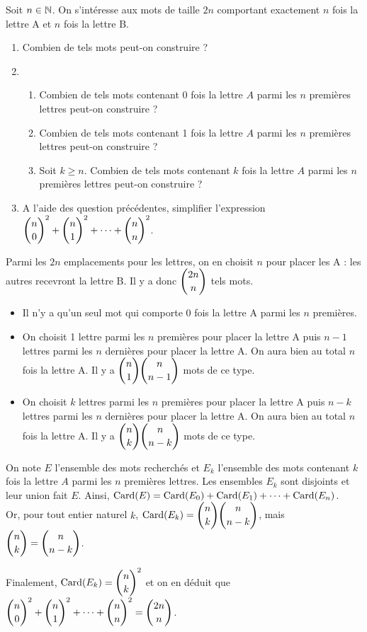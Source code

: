 \documentclass[11pt,fleqn, openany]{book} %
\begin{document}
\begin{exercise}Soit $n\in \mathbb{N}$. On s'intéresse aux mots de taille $2n$ comportant exactement $n$ fois la lettre A et $n$ fois la lettre B.

\begin{enumerate}
\item Combien de tels mots peut-on construire ?
\item \begin{enumerate}
\item Combien de tels mots contenant 0 fois la lettre $A$ parmi les $n$ premières lettres peut-on construire ?
\item Combien de tels mots contenant 1 fois la lettre $A$ parmi les $n$ premières lettres peut-on construire ?
\item Soit $k\geqslant n$. Combien de tels mots contenant $k$ fois la lettre $A$ parmi les $n$ premières lettres peut-on construire ?
\end{enumerate}
\item A l'aide des question précédentes, simplifier l'expression $\dbinom{n}{0}^2+\dbinom{n}{1}^2+\dots+\dbinom{n}{n}^2$.
\end{enumerate}
\end{exercise}

\begin{solution}Parmi les $2n$ emplacements pour les lettres, on en choisit $n$ pour placer les A : les autres recevront la lettre B. Il y a donc $\dbinom{2n}{n}$ tels mots.

\begin{itemize}
\item Il n'y a qu'un seul mot qui comporte 0 fois la lettre A parmi les $n$ premières.
\item On choisit 1 lettre parmi les $n$ premières pour placer la lettre A puis $n-1$ lettres parmi les $n$ dernières pour placer la lettre A. On aura bien au total $n$ fois la lettre A. Il y a $\dbinom{n}{1}\dbinom{n}{n-1}$ mots de ce type.
\item On choisit $k$ lettres parmi les $n$ premières pour placer la lettre A puis $n-k$ lettres parmi les $n$ dernières pour placer la lettre A. On aura bien au total $n$ fois la lettre A. Il y a $\dbinom{n}{k}\dbinom{n}{n-k}$ mots de ce type.
\end{itemize}

On note $E$ l'ensemble des mots recherchés et $E_k$ l'ensemble des mots contenant $k$ fois la lettre $A$ parmi les $n$ premières lettres. Les ensembles $E_k$ sont disjoints et leur union fait $E$. Ainsi, $\mathrm{Card}(E)=\mathrm{Card}(E_0)+\mathrm{Card}(E_1)+\dots + \mathrm{Card}(E_n)$. \\Or, pour tout entier naturel $k$, $\mathrm{Card}(E_k)=\dbinom{n}{k}\dbinom{n}{n-k}$, mais $\dbinom{n}{k}=\dbinom{n}{n-k}$. 

Finalement, $\mathrm{Card}(E_k)=\dbinom{n}{k}^2$ et on en déduit que  $\dbinom{n}{0}^2+\dbinom{n}{1}^2+\dots+\dbinom{n}{n}^2=\dbinom{2n}{n}$.\end{solution}
\end{document}
